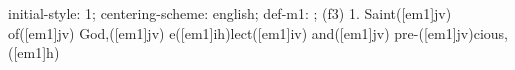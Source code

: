 initial-style: 1;
centering-scheme: english;
def-m1: \grealign;
(f3) 1. Saint([em1]jv) of([em1]jv) God,([em1]jv) e([em1]ih)lect([em1]iv) and([em1]jv) pre-([em1]jv)cious,([em1]h)